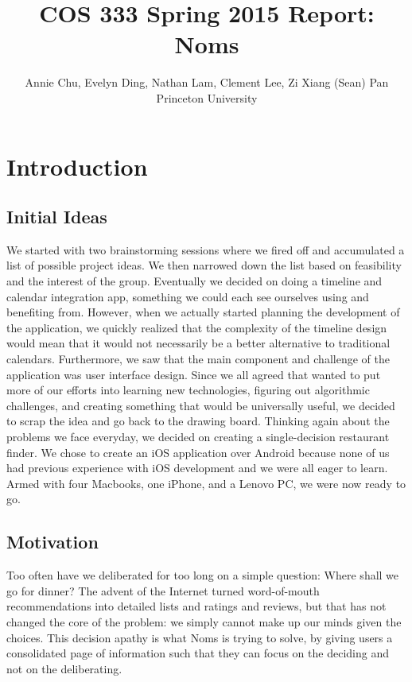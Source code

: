 \documentclass[12pt]{article}
\begin{document}
\title{\textbf{COS 333 Spring 2015 Report: Noms}}
	
\author{
		Annie Chu, Evelyn Ding, Nathan Lam, Clement Lee, Zi Xiang (Sean) Pan \\
		Princeton University}
	
\maketitle	
\section{Introduction}
\subsection{Initial Ideas}
We started with two brainstorming sessions where we fired off and accumulated a list of possible project ideas. We then narrowed down the list based on feasibility and the interest of the group. Eventually we decided on doing a timeline and calendar integration app, something we could each see ourselves using and benefiting from. However, when we actually started planning the development of the application, we quickly realized that the complexity of the timeline design would mean that it would not necessarily be a better alternative to traditional calendars. Furthermore, we saw that the main component and challenge of the application was user interface design. Since we all agreed that wanted to put more of our efforts into learning new technologies, figuring out algorithmic challenges, and creating something that would be universally useful, we decided to scrap the idea and go back to the drawing board. Thinking again about the problems we face everyday, we decided on creating a single-decision restaurant finder. We chose to create an iOS application over Android because none of us had previous experience with iOS development and we were all eager to learn. Armed with four Macbooks, one iPhone, and a Lenovo PC, we were now ready to go.

\subsection{Motivation}
Too often have we deliberated for too long on a simple question: Where shall we go for dinner? The advent of the Internet turned word-of-mouth recommendations into detailed lists and ratings and reviews, but that has not changed the core of the problem: we simply cannot make up our minds given the choices. This decision apathy is what Noms is trying to solve, by giving users a consolidated page of information such that they can focus on the deciding and not on the deliberating.
\end{document}
